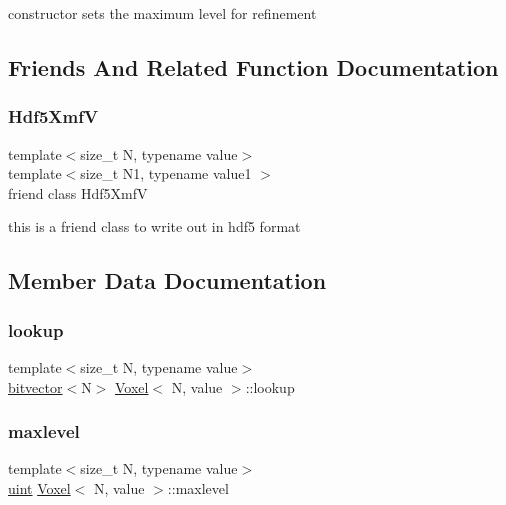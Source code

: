constructor sets the maximum level for refinement 

\subsection{Friends And Related Function Documentation}
\mbox{\label{classVoxel_a7f84a23096bb6840efa341b4cde72d9d}} 
\subsubsection{\texorpdfstring{Hdf5\+XmfV}{Hdf5XmfV}}
{\footnotesize\ttfamily template$<$size\+\_\+t N, typename value$>$ \\
template$<$size\+\_\+t N1, typename value1 $>$ \\
friend class Hdf5\+XmfV\hspace{0.3cm}{\ttfamily [friend]}}

this is a friend class to write out in hdf5 format 

\subsection{Member Data Documentation}
\mbox{\label{classVoxel_a4e8a1661e9468250e10aa861d61f861e}} 
\subsubsection{\texorpdfstring{lookup}{lookup}}
{\footnotesize\ttfamily template$<$size\+\_\+t N, typename value$>$ \\
\mbox{\hyperlink{definitions_8h_a55821d7929f3f16aaf1466129c209492}{bitvector}}$<$N$>$ \mbox{\hyperlink{classVoxel}{Voxel}}$<$ N, value $>$\+::lookup\hspace{0.3cm}{\ttfamily [private]}}

\mbox{\label{classVoxel_addc02aaaef2f93ffcae1ded7a2184518}} 
\subsubsection{\texorpdfstring{maxlevel}{maxlevel}}
{\footnotesize\ttfamily template$<$size\+\_\+t N, typename value$>$ \\
\mbox{\hyperlink{definitions_8h_a69aa29b598b851b0640aa225a9e5d61d}{uint}} \mbox{\hyperlink{classVoxel}{Voxel}}$<$ N, value $>$\+::maxlevel\hspace{0.3cm}{\ttfamily [private]}}

